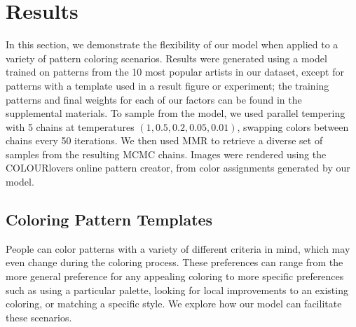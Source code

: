 \section{Results}
\label{sec:results}


In this section, we demonstrate the flexibility of our model when applied to a variety of pattern coloring scenarios. Results were generated using a model trained on patterns from the 10 most popular artists in our dataset, except for patterns with a template used in a result figure or experiment; the training patterns and final weights for each of our factors can be found in the supplemental materials. To sample from the model, we used parallel tempering with 5 chains at temperatures $(1, 0.5, 0.2, 0.05, 0.01)$, swapping colors between chains every 50 iterations. We then used MMR to retrieve a diverse set of samples from the resulting MCMC chains. Images were rendered using the COLOURlovers online pattern creator, from color assignments generated by our model.

\subsection{Coloring Pattern Templates}

People can color patterns with a variety of different criteria in mind, which may even change during the coloring process. These preferences can range from the more general preference for any appealing coloring to more specific preferences such as using a particular palette, looking for local improvements to an existing coloring, or matching a specific style. We explore how our model can facilitate these scenarios.


